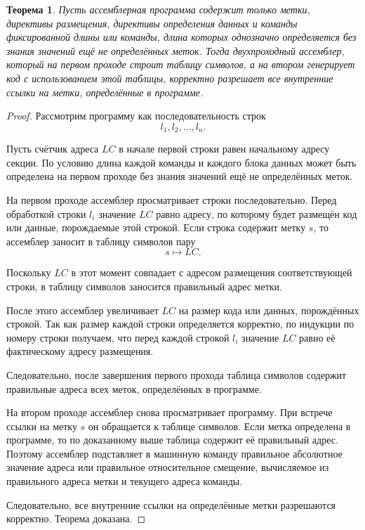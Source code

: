\documentclass[12pt,a4paper]{article}
\newtheorem{theorem}{Теорема}
\begin{document}
\begin{theorem}
Пусть ассемблерная программа содержит только метки, директивы размещения, директивы определения данных и команды фиксированной длины или команды, длина которых однозначно определяется без знания значений ещё не определённых меток. Тогда двухпроходный ассемблер, который на первом проходе строит таблицу символов, а на втором генерирует код с использованием этой таблицы, корректно разрешает все внутренние ссылки на метки, определённые в программе.
\end{theorem}

\begin{proof}
Рассмотрим программу как последовательность строк
\[
l_1, l_2, \ldots, l_n.
\]

Пусть счётчик адреса $LC$ в начале первой строки равен начальному адресу секции. По условию длина каждой команды и каждого блока данных может быть определена на первом проходе без знания значений ещё не определённых меток.

На первом проходе ассемблер просматривает строки последовательно. Перед обработкой строки $l_i$ значение $LC$ равно адресу, по которому будет размещён код или данные, порождаемые этой строкой. Если строка содержит метку $s$, то ассемблер заносит в таблицу символов пару
\[
s \mapsto LC.
\]

Поскольку $LC$ в этот момент совпадает с адресом размещения соответствующей строки, в таблицу символов заносится правильный адрес метки.

После этого ассемблер увеличивает $LC$ на размер кода или данных, порождённых строкой. Так как размер каждой строки определяется корректно, по индукции по номеру строки получаем, что перед каждой строкой $l_i$ значение $LC$ равно её фактическому адресу размещения.

Следовательно, после завершения первого прохода таблица символов содержит правильные адреса всех меток, определённых в программе.

На втором проходе ассемблер снова просматривает программу. При встрече ссылки на метку $s$ он обращается к таблице символов. Если метка определена в программе, то по доказанному выше таблица содержит её правильный адрес. Поэтому ассемблер подставляет в машинную команду правильное абсолютное значение адреса или правильное относительное смещение, вычисляемое из правильного адреса метки и текущего адреса команды.

Следовательно, все внутренние ссылки на определённые метки разрешаются корректно. Теорема доказана.
\end{proof}
\end{document}
